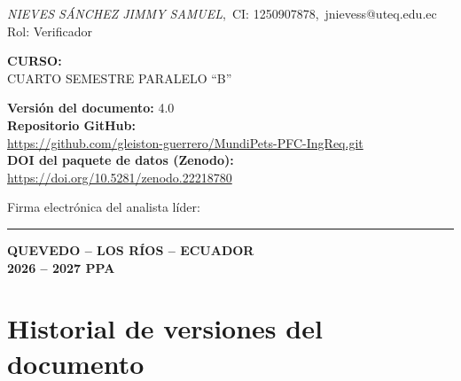 \documentclass[journal,onecolumn]{IEEEtran}
\begin{document}
\begin{titlepage}
		\textit{NIEVES SÁNCHEZ JIMMY SAMUEL},~CI: 1250907878,~jnievess@uteq.edu.ec\\
		{\small Rol: Verificador}
		
		\vspace{0.2cm}
		
		{\normalsize\bfseries CURSO:}\\[4pt]
		{\normalsize CUARTO SEMESTRE PARALELO \enquote{B}}
		
		\vspace{0.2cm}
		
		{\normalsize\bfseries Versión del documento:} 4.0\\[4pt]
		\textbf{Repositorio GitHub:}\\
		\url{https://github.com/gleiston-guerrero/MundiPets-PFC-IngReq.git}\\[6pt]
		\textbf{DOI del paquete de datos (Zenodo):}\\
		\url{https://doi.org/10.5281/zenodo.22218780}
		
		
		\vspace{1.8cm}
		
		{\small Firma electrónica del analista líder: \rule{5cm}{0.4pt}}
		
		{\normalsize\bfseries QUEVEDO -- LOS RÍOS -- ECUADOR}\\[4pt]
		{\normalsize\bfseries 2026 -- 2027 PPA}
		
	\end{titlepage}
	
	\section*{Historial de versiones del documento}
	
\end{document}
